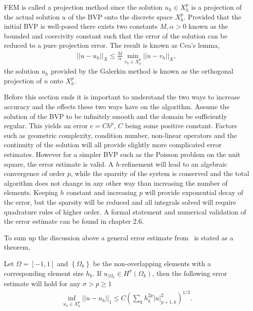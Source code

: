 FEM is called a projection method since the solution $u_h\in X_h^p$ is a projection
of the actual solution $u$ of the BVP onto the discrete space $X_h^p$. Provided that the initial BVP is well-posed there exists two 
constants $M,\alpha>0$ known as the bounded and coercivity constant such that the error of the solution can be reduced to a pure 
projection error. The result is known as Cea's lemma,  
\begin{align}
    ||u-u_h||_X \leq \frac{M}{\alpha}\min_{v_h\in X_h^p}||u-v_h||_X,
    \label{eq:Cea}
\end{align}
the solution $u_h$ provided by the Galerkin method is known as the orthogonal projection of $u$ onto $X_h^p$. 

Before this section ends it is important to understand the two ways to increase accuracy and the effects these two ways have on the algorithm. 
Assume the solution of the BVP to be infinitely smooth and the domain be sufficiently regular. 
This yields an error $e = Ch^p$, $C$ being some positive constant.
Factors such as geometric complexity, condition number, non-linear operators and the continuity of the 
solution will all provide slightly more complicated error estimates. 
However for a simpler BVP such as the Poisson problem on the unit square, the error estimate is valid.  
A $h$-refinement will lead to an algebraic convergence of order $p$, while the sparsity of the system is conserved
and the total algorithm does not change in any other way than increasing the number of elements.
Keeping $h$ constant and increasing $p$ will provide exponential decay of the error, but the sparsity will be reduced and all integrals solved will require 
quadrature rules of higher order. A formal statement and numerical validation of the error estimate can be found in \cite{Karniadakis} chapter 2.6.  

To sum up the discussion above a general error estimate from~\cite{Quarteroni} is stated as a theorem, 
\begin{theorem}
    Let $\Omega = [-1,1]$ and $\left\{ \Omega_k \right\}$ 
    be the non-overlapping elements with a corresponding element size $h_k$.
    If $u_{|\Omega_k} \in H^{\sigma}(\Omega_k)$, 
    then the following error estimate will hold for any $ \sigma > p \ge 1$ 
\begin{align}
    \inf_{u_h \in X_h^p} ||u-u_h||_1 \le C\left( \sum_{k} h_k^{2p}|u|^2_{p+1,k} \right)^{1/2}.
\end{align}
    \label{thm:femconvergence}
\end{theorem}
%

